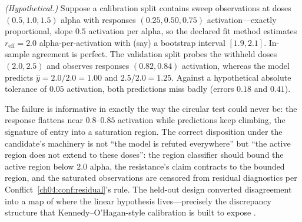 \begin{example}\label{ch06:ex:fail}
\emph{(Hypothetical.)} Suppose a calibration split contains sweep
observations at doses $(0.5, 1.0, 1.5)$ alpha with responses
$(0.25, 0.50, 0.75)$ activation---exactly proportional, slope
$0.5$ activation per alpha, so the declared fit method estimates
$r_{\mathrm{eff}} = 2.0$ alpha-per-activation with (say) a bootstrap
interval $[1.9, 2.1]$. In-sample agreement is perfect. The validation split
probes the withheld doses $(2.0, 2.5)$ and observes responses
$(0.82, 0.84)$ activation, whereas the model predicts
$\hat y = 2.0/2.0 = 1.00$ and $2.5/2.0 = 1.25$. Against a hypothetical
absolute tolerance of $0.05$ activation, both predictions miss badly
(errors $0.18$ and $0.41$).

The failure is informative in exactly the way the circular test could
never be: the response flattens near $0.8$--$0.85$ activation while
predictions keep climbing, the signature of entry into a saturation
region. The correct disposition under the candidate's machinery is not
``the model is refuted everywhere'' but ``the active region does not
extend to these doses'': the region classifier should bound the
active region below $2.0$ alpha, the resistance's claim contracts to the
bounded region, and the saturated observations are censored from residual
diagnostics per Conflict~\ref{ch04:conf:residual}'s rule. The held-out
design converted disagreement into a map of where the linear hypothesis
lives---precisely the discrepancy structure that Kennedy--O'Hagan-style
calibration is built to expose \cite{kennedyohagan}.
\end{example}

